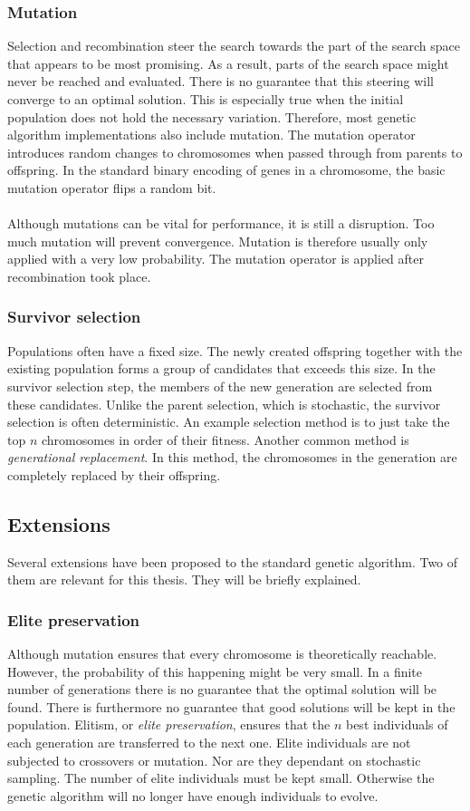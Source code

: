 \subsubsection{Mutation}
Selection and recombination steer the search towards the part of the search
space that appears to be most promising. As a result, parts of the search space
might never be reached and evaluated. There is no guarantee that this steering
will converge to an optimal solution. This is especially true when the initial
population does not hold the necessary variation. Therefore, most genetic algorithm
implementations also include mutation. The mutation operator introduces random
changes to chromosomes when passed through from parents to offspring. In the
standard binary encoding of genes in a chromosome, the basic mutation operator
flips a random bit.\\\\
\noindent
Although mutations can be vital for performance, it is still a disruption. Too
much mutation will prevent convergence. Mutation is therefore usually only
applied with a very low probability. The mutation operator is applied after
recombination took place.
\subsubsection{Survivor selection}
Populations often have a fixed size. The newly created offspring together with
the existing population forms a group of candidates that exceeds this size. In
the survivor selection step, the members of the new generation are selected
from these candidates. Unlike the parent selection, which is stochastic, the
survivor selection is often deterministic. An example selection method is to
just take the top $n$ chromosomes in order of their fitness. Another common
method is \emph{generational replacement}. In this method, the chromosomes in
the generation are completely replaced by their offspring.
\subsection{Extensions}
Several extensions have been proposed to the standard genetic algorithm. Two of
them are relevant for this thesis. They will be briefly explained.
\subsubsection{Elite preservation}
Although mutation ensures that every chromosome is theoretically reachable.
However, the probability of this happening might be very small. In a finite
number of generations there is no guarantee that the optimal solution will be
found. There is furthermore no guarantee that good solutions will be kept in
the population. Elitism, or \emph{elite preservation}, ensures that the $n$
best individuals of each generation are transferred to the next one. Elite
individuals are not subjected to crossovers or mutation. Nor are they dependant
on stochastic sampling. The number of elite individuals must be kept small.
Otherwise the genetic algorithm will no longer have enough individuals to evolve.
